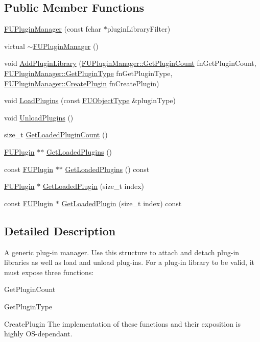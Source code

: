 \subsection*{Public Member Functions}
\begin{DoxyCompactItemize}
\item 
\hyperlink{classFUPluginManager_aa97b81224206a2626c1f8be258f444c3}{FUPluginManager} (const fchar $\ast$pluginLibraryFilter)
\item 
virtual \hyperlink{classFUPluginManager_a6bbc30b218bef777c704d63fe75a3132}{$\sim$FUPluginManager} ()
\item 
void \hyperlink{classFUPluginManager_a8a0d8627cc79ae1eedcb1450178c8184}{AddPluginLibrary} (\hyperlink{classFUPluginManager_aa7465d51db4f1f1e0386310ae6922250}{FUPluginManager::GetPluginCount} fnGetPluginCount, \hyperlink{classFUPluginManager_ad253785d39bca14d77ddf9d9181e7fb1}{FUPluginManager::GetPluginType} fnGetPluginType, \hyperlink{classFUPluginManager_a8e4ad834c03cad334f3bbd6158416a43}{FUPluginManager::CreatePlugin} fnCreatePlugin)
\item 
void \hyperlink{classFUPluginManager_a0ebe80f92e495c20e7cce5663510401b}{LoadPlugins} (const \hyperlink{classFUObjectType}{FUObjectType} \&pluginType)
\item 
void \hyperlink{classFUPluginManager_a0b6695e71aa89a2ce7b800543f52f03d}{UnloadPlugins} ()
\item 
size\_\-t \hyperlink{classFUPluginManager_a8da16d6823219e0b04251c7577009fb4}{GetLoadedPluginCount} ()
\item 
\hyperlink{classFUPlugin}{FUPlugin} $\ast$$\ast$ \hyperlink{classFUPluginManager_a0dbca385003a3a3d4d16334f08f93a33}{GetLoadedPlugins} ()
\item 
const \hyperlink{classFUPlugin}{FUPlugin} $\ast$$\ast$ \hyperlink{classFUPluginManager_a17da8db670809dd03a8ab6eef17f4db9}{GetLoadedPlugins} () const 
\item 
\hyperlink{classFUPlugin}{FUPlugin} $\ast$ \hyperlink{classFUPluginManager_a4be42bc54895efe5e48abc9121961f5c}{GetLoadedPlugin} (size\_\-t index)
\item 
const \hyperlink{classFUPlugin}{FUPlugin} $\ast$ \hyperlink{classFUPluginManager_a316b3e7aa0de5c8c6c90376a61ccbe1f}{GetLoadedPlugin} (size\_\-t index) const 
\end{DoxyCompactItemize}


\subsection{Detailed Description}
A generic plug-\/in manager. Use this structure to attach and detach plug-\/in libraries as well as load and unload plug-\/ins. For a plug-\/in library to be valid, it must expose three functions:
\begin{DoxyItemize}
\item GetPluginCount
\item GetPluginType
\item CreatePlugin The implementation of these functions and their exposition is highly OS-\/dependant. 
\end{DoxyItemize}

